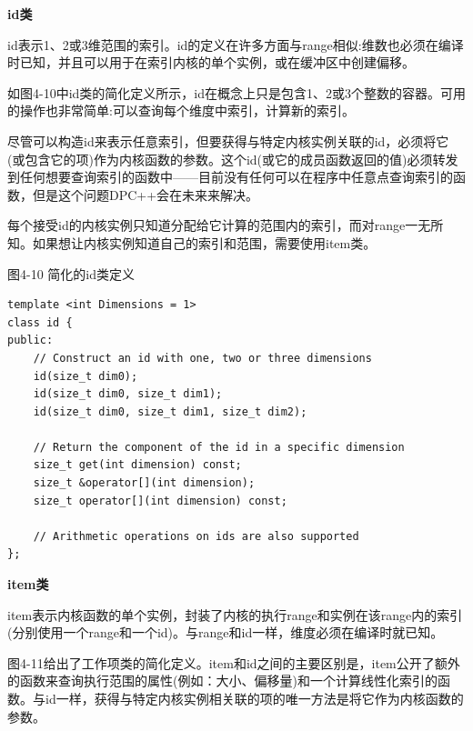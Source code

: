 \hspace*{\fill} \par %
\textbf{id类}

id表示1、2或3维范围的索引。id的定义在许多方面与range相似:维数也必须在编译时已知，并且可以用于在索引内核的单个实例，或在缓冲区中创建偏移。\par

如图4-10中id类的简化定义所示，id在概念上只是包含1、2或3个整数的容器。可用的操作也非常简单:可以查询每个维度中索引，计算新的索引。\par

尽管可以构造id来表示任意索引，但要获得与特定内核实例关联的id，必须将它(或包含它的项)作为内核函数的参数。这个id(或它的成员函数返回的值)必须转发到任何想要查询索引的函数中——目前没有任何可以在程序中任意点查询索引的函数，但是这个问题DPC++会在未来来解决。\par

每个接受id的内核实例只知道分配给它计算的范围内的索引，而对range一无所知。如果想让内核实例知道自己的索引和范围，需要使用item类。\par

\hspace*{\fill} \par %
图4-10 简化的id类定义
\begin{lstlisting}[caption={}]
template <int Dimensions = 1>
class id {
public:
	// Construct an id with one, two or three dimensions
	id(size_t dim0);
	id(size_t dim0, size_t dim1);
	id(size_t dim0, size_t dim1, size_t dim2);
	
	// Return the component of the id in a specific dimension 
	size_t get(int dimension) const;
	size_t &operator[](int dimension);
	size_t operator[](int dimension) const;
	
	// Arithmetic operations on ids are also supported
};
\end{lstlisting}

\hspace*{\fill} \par %
\textbf{item类}

item表示内核函数的单个实例，封装了内核的执行range和实例在该range内的索引(分别使用一个range和一个id)。与range和id一样，维度必须在编译时就已知。\par

图4-11给出了工作项类的简化定义。item和id之间的主要区别是，item公开了额外的函数来查询执行范围的属性(例如：大小、偏移量)和一个计算线性化索引的函数。与id一样，获得与特定内核实例相关联的项的唯一方法是将它作为内核函数的参数。\par


